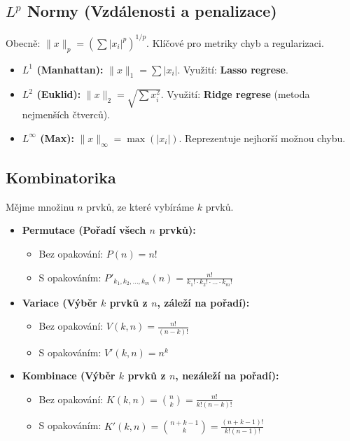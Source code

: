 \documentclass[a4paper, 11pt]{article}
\begin{document}
\subsection*{$L^p$ Normy (Vzdálenosti a penalizace)}
Obecně: $\|x\|_p = \left( \sum |x_i|^p \right)^{1/p}$. Klíčové pro metriky chyb a regularizaci.
\begin{itemize}
    \item \textbf{$L^1$ (Manhattan):} $\|x\|_1 = \sum |x_i|$. Využití: \textbf{Lasso regrese}.
    \item \textbf{$L^2$ (Euklid):} $\|x\|_2 = \sqrt{\sum x_i^2}$. Využití: \textbf{Ridge regrese} (metoda nejmenších čtverců).
    \item \textbf{$L^\infty$ (Max):} $\|x\|_\infty = \max(|x_i|)$. Reprezentuje nejhorší možnou chybu.
\end{itemize}

\subsection*{Kombinatorika}
Mějme množinu $n$ prvků, ze které vybíráme $k$ prvků.

\begin{itemize}
    \item \textbf{Permutace (Pořadí všech $n$ prvků):}
    \begin{itemize}
        \item Bez opakování: $P(n) = n!$
        \item S opakováním: $P'_{k_1, k_2, \dots, k_m}(n) = \frac{n!}{k_1! \cdot k_2! \cdot \dots \cdot k_m!}$
    \end{itemize}
    
    \item \textbf{Variace (Výběr $k$ prvků z $n$, záleží na pořadí):}
    \begin{itemize}
        \item Bez opakování: $V(k, n) = \frac{n!}{(n-k)!}$
        \item S opakováním: $V'(k, n) = n^k$
    \end{itemize}

    \item \textbf{Kombinace (Výběr $k$ prvků z $n$, nezáleží na pořadí):}
    \begin{itemize}
        \item Bez opakování: $K(k, n) = \binom{n}{k} = \frac{n!}{k!(n-k)!}$
        \item S opakováním: $K'(k, n) = \binom{n+k-1}{k} = \frac{(n+k-1)!}{k!(n-1)!}$
    \end{itemize}
\end{itemize}
\end{document}
